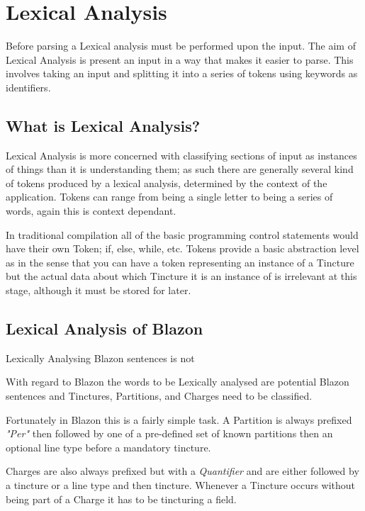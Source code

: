 \chapter{Lexical Analysis} 


Before parsing a Lexical analysis must be performed upon the input. The aim of Lexical Analysis is present an input in a way that makes it easier to parse.  This involves taking an input and splitting it into a series of tokens using keywords as identifiers.


\section{What is Lexical Analysis?}
Lexical Analysis is more concerned with classifying sections of input as instances of things than it is understanding them; as such there are generally several kind of tokens produced by a lexical analysis, determined by the context of the application.  Tokens can range from being a single letter to being a series of words, again this is context dependant.

In traditional compilation all of the basic programming control statements would have their own Token; if, else, while, etc.  Tokens provide a basic abstraction level as in the sense that you can have a token representing an instance of a Tincture but the actual data about which Tincture it is an instance of is irrelevant at this stage, although it must be stored for later. 


\section{Lexical Analysis of Blazon} 


Lexically Analysing Blazon sentences is not 

With regard to Blazon the words to be Lexically analysed are potential Blazon sentences and Tinctures, Partitions, and Charges need to be classified.



  Fortunately in Blazon this is a fairly simple task.  A Partition is always prefixed \emph{"Per"} then followed by one of a pre-defined set of known partitions then an optional line type before a mandatory tincture. 


Charges are also always prefixed but with a \emph{Quantifier} and are either followed by a tincture or a line type and then tincture.  Whenever a Tincture occurs without being part of a Charge it has to be tincturing a field. 
 

